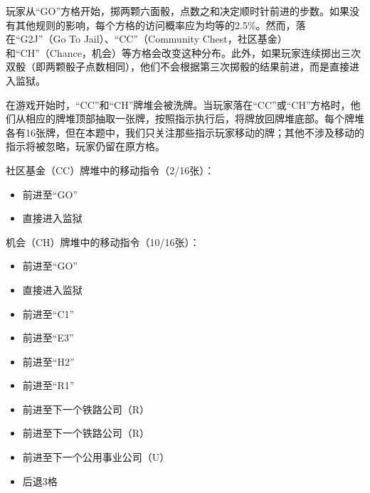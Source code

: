 \begin{tcolorbox}[breakable]
\begin{center}
	\end{center}
	玩家从\enquote{GO}方格开始，掷两颗六面骰，点数之和决定顺时针前进的步数。如果没有其他规则的影响，每个方格的访问概率应为均等的2.5\%。然而，落在\enquote{G2J}（Go To Jail）、\enquote{CC}（Community Chest，社区基金）和\enquote{CH}（Chance，机会）等方格会改变这种分布。此外，如果玩家连续掷出三次双骰（即两颗骰子点数相同），他们不会根据第三次掷骰的结果前进，而是直接进入监狱。

	在游戏开始时，\enquote{CC}和\enquote{CH}牌堆会被洗牌。当玩家落在\enquote{CC}或\enquote{CH}方格时，他们从相应的牌堆顶部抽取一张牌，按照指示执行后，将牌放回牌堆底部。每个牌堆各有16张牌，但在本题中，我们只关注那些指示玩家移动的牌；其他不涉及移动的指示将被忽略，玩家仍留在原方格。

	社区基金（CC）牌堆中的移动指令（2/16张）：

	\begin{itemize}
		\item 	前进至\enquote{GO}
		\item 	直接进入监狱
	\end{itemize}

	机会（CH）牌堆中的移动指令（10/16张）：
	\begin{itemize}
		\item 	前进至\enquote{GO}
		\item 	直接进入监狱
		\item 	前进至\enquote{C1}
		\item 	前进至\enquote{E3}
		\item 	前进至\enquote{H2}
		\item 	前进至\enquote{R1}
		\item 	前进至下一个铁路公司（R）
		\item 	前进至下一个铁路公司（R）
		\item 	前进至下一个公用事业公司（U）
		\item 	后退3格
	\end{itemize}


\end{tcolorbox}
